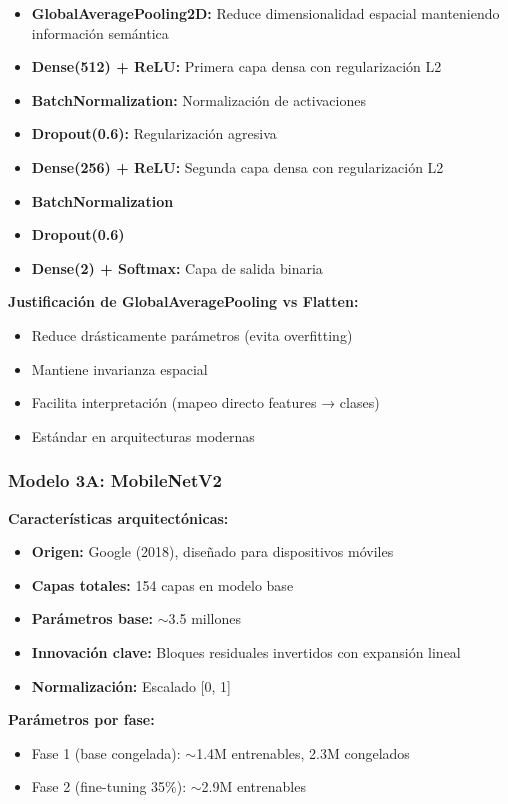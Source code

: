 \documentclass[11pt, a4paper]{article}
\begin{document}
\begin{itemize}
    \item \textbf{GlobalAveragePooling2D:} Reduce dimensionalidad espacial manteniendo información semántica
    \item \textbf{Dense(512) + ReLU:} Primera capa densa con regularización L2
    \item \textbf{BatchNormalization:} Normalización de activaciones
    \item \textbf{Dropout(0.6):} Regularización agresiva
    \item \textbf{Dense(256) + ReLU:} Segunda capa densa con regularización L2
    \item \textbf{BatchNormalization}
    \item \textbf{Dropout(0.6)}
    \item \textbf{Dense(2) + Softmax:} Capa de salida binaria
\end{itemize}

\textbf{Justificación de GlobalAveragePooling vs Flatten:}
\begin{itemize}
    \item Reduce drásticamente parámetros (evita overfitting)
    \item Mantiene invarianza espacial
    \item Facilita interpretación (mapeo directo features → clases)
    \item Estándar en arquitecturas modernas
\end{itemize}

\subsubsection{Modelo 3A: MobileNetV2}

\textbf{Características arquitectónicas:}
\begin{itemize}
    \item \textbf{Origen:} Google (2018), diseñado para dispositivos móviles
    \item \textbf{Capas totales:} 154 capas en modelo base
    \item \textbf{Parámetros base:} $\sim$3.5 millones
    \item \textbf{Innovación clave:} Bloques residuales invertidos con expansión lineal
    \item \textbf{Normalización:} Escalado [0, 1]
\end{itemize}

\textbf{Parámetros por fase:}
\begin{itemize}
    \item Fase 1 (base congelada): $\sim$1.4M entrenables, 2.3M congelados
    \item Fase 2 (fine-tuning 35\%): $\sim$2.9M entrenables
\end{itemize}
\end{document}
